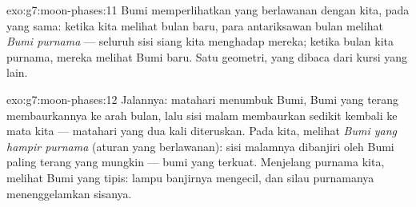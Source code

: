 \begin{solution}{exo:g7:moon-phases:11}
Bumi memperlihatkan  yang berlawanan dengan  kita, pada 
yang sama: ketika kita melihat bulan baru, para antariksawan bulan
melihat \emph{Bumi purnama} --- seluruh sisi siang kita menghadap
mereka; ketika bulan kita purnama, mereka melihat Bumi baru. Satu
geometri, yang dibaca dari kursi yang lain.
\end{solution}

\begin{solution}{exo:g7:moon-phases:12}
Jalannya:  matahari menumbuk Bumi, Bumi yang terang
membaurkannya ke arah bulan, lalu sisi malam  membaurkan sedikit
kembali ke mata kita ---  matahari yang dua kali diteruskan. Pada
  kita,  melihat \emph{Bumi yang hampir purnama}
(aturan  yang berlawanan): sisi malamnya dibanjiri  oleh
Bumi paling terang yang mungkin ---  bumi yang terkuat. Menjelang
purnama kita,  melihat Bumi  yang tipis: lampu banjirnya
mengecil, dan silau  purnamanya menenggelamkan sisanya.
\end{solution}

